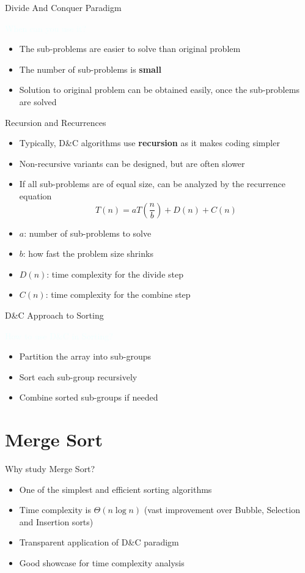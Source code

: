 \documentclass{beamer}
\newcommand{\tblue}[1]{{\Large {\textcolor{azure}{#1}}}}
\begin{document}
\begin{frame}{Divide And Conquer Paradigm}

\tblue{When can you use it?}
\begin{itemize}
\item The sub-problems are easier to solve than original problem
\item The number of sub-problems is {\bf small}
\item Solution to original problem can be obtained easily, once the sub-problems are solved
\end{itemize}
\end{frame}


\begin{frame}{Recursion and Recurrences}
\begin{itemize}
\item Typically, D\&C algorithms use {\bf recursion} as it makes coding simpler
\item Non-recursive variants can be designed, but are often slower
\item If all sub-problems are of equal size, can be analyzed by the recurrence equation 
$$ T(n) = a T(\frac{n}{b}) + D(n) + C(n)$$
\item $a$: number of sub-problems to solve 
\item $b$: how fast the problem size shrinks
\item $D(n)$: time complexity for the divide step
\item $C(n)$: time complexity for the combine step
\end{itemize}
\end{frame}

\begin{frame}{D\&C Approach to Sorting}

\tblue{How to use D\&C in Sorting?}
\begin{itemize}
\item Partition the array into sub-groups
\item Sort each sub-group recursively
\item Combine sorted sub-groups if needed
\end{itemize}
\end{frame}

\section{Merge Sort}
\begin{frame}{Why study Merge Sort?}
\begin{itemize}
\item One of the simplest and efficient sorting algorithms
\item Time complexity is $\Theta(n \log n)$ (vast improvement over Bubble, Selection and Insertion sorts)
\item Transparent application of D\&C paradigm
\item Good showcase for time complexity analysis
\end{itemize}
\end{frame}
\end{document}
